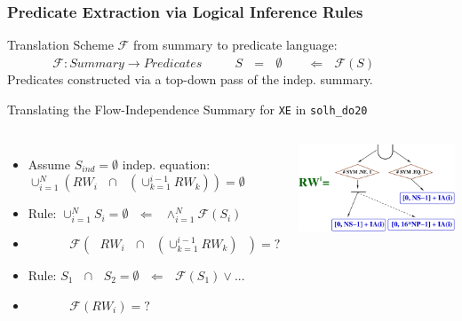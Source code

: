 \documentclass{beamer}
\renewcommand{\emph}[1]{\textcolor{structure}{#1}}
\newcommand{\emp}[1]{\textcolor{DikuRed}{ #1}}
\begin{document}
\begin{frame}[fragile,t]
  \frametitle{Predicate Extraction via Logical Inference Rules}

Translation Scheme $\mathcal{F}$ from summary to predicate language: \smallskip \\ 
$\mbox{ }\mbox{ }\mbox{ }\mbox{ }\mbox{ }$ $\mathcal{F} : Summary \rightarrow Predicates$ 
$\mbox{ }\mbox{ }\mbox{ }$  \emp{$S \mbox{ }=\mbox{ } \emptyset \mbox{ }\mbox{ }\mbox{ }\Leftarrow \mbox{ }\mathcal{F}(S)$} \smallskip \\

Predicates constructed via a top-down pass of the indep. summary. \smallskip 

\pause

\begin{block}{ Translating the Flow-Independence Summary for {\tt XE} in {\tt solh\_do20} } \vspace{-1ex}
\begin{columns} 
\begin{itemize}
    \item Assume $S_{ind}=\emptyset$ indep. equation: \smallskip \\
$\cup_{i=1}^{N}(RW_i \mbox{ }\cap\mbox{ } (\cup_{k=1}^{i-1}RW_k))=\emptyset$  \bigskip

    \item \emph{Rule: $\cup_{i=1}^{N}S_{i}=\emptyset \mbox{ }\Leftarrow\mbox{ } \wedge^N_{i=1}\mathcal{F}(S_i)$} \pause \bigskip

    \item \emp{$\mbox{ }\mbox{ }\mbox{ }\mbox{ }\mbox{ }\mathcal{F}(\mbox{ }RW_i \mbox{ }\cap\mbox{ } (\cup_{k=1}^{i-1}RW_k)\mbox{ }) = ?$}  \bigskip

    \item \emph{Rule: $S_1 \mbox{ }\cap\mbox{ } S_2 = \emptyset \mbox{ }\Leftarrow\mbox{ }\mathcal{F}(S_1) \vee ... $} \pause \bigskip

    \item \emp{$\mbox{ }\mbox{ }\mbox{ }\mbox{ }\mbox{ }\mathcal{F}(RW_i) = ?$}
\end{itemize}
\begin{center} \hspace{-4ex}
\includegraphics[height=15ex]{Figures/RW_IND_XE}
\end{center}
\end{columns}
\end{block}

\end{frame}
\end{document}
